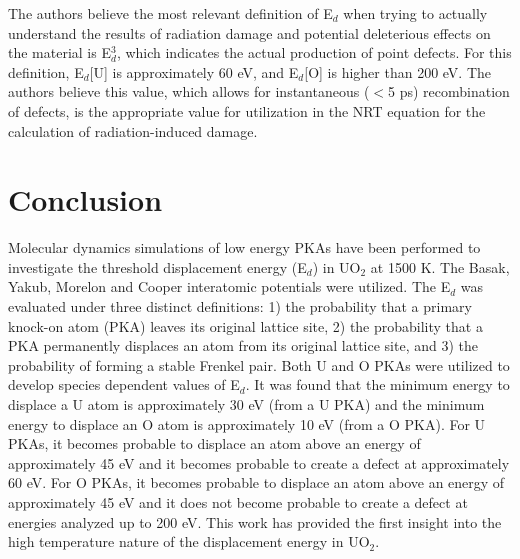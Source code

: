 \documentclass[review]{elsarticle}
\begin{document}
The authors believe the most relevant definition of E$_d$ when trying to actually understand the results of radiation damage and potential deleterious effects on the material is E$_d^3$, which indicates the actual production of point defects. For this definition, E$_d$[U] is approximately 60 eV, and E$_d$[O] is higher than 200 eV. The authors believe this value, which allows for instantaneous ($<$5 ps) recombination of defects, is the appropriate value for utilization in the NRT equation for the calculation of radiation-induced damage.

\FloatBarrier

\section{Conclusion}
\hspace{5mm}

Molecular dynamics simulations of low energy PKAs have been performed to investigate the threshold displacement energy (E$_d$) in UO$_2$ at 1500 K. The Basak, Yakub, Morelon and Cooper interatomic potentials were utilized. The E$_d$ was evaluated under three distinct definitions: 1) the probability that a primary knock-on atom (PKA) leaves its original lattice site, 2) the probability that a PKA permanently displaces an atom from its original lattice site, and 3) the probability of forming a stable Frenkel pair. Both U and O PKAs were utilized to develop species dependent values of E$_d$. It was found that the minimum energy to displace a U atom is approximately 30 eV (from a U PKA) and the minimum energy to displace an O atom is approximately 10 eV (from a O PKA). For U PKAs, it becomes probable to displace an atom above an energy of approximately 45 eV and it becomes probable to create a defect at approximately 60 eV. For O PKAs, it becomes probable to displace an atom above an energy of approximately 45 eV and it does not become probable to create a defect at energies analyzed up to 200 eV. This work has provided the first insight into the high temperature nature of the displacement energy in UO$_2$.




\end{document}
